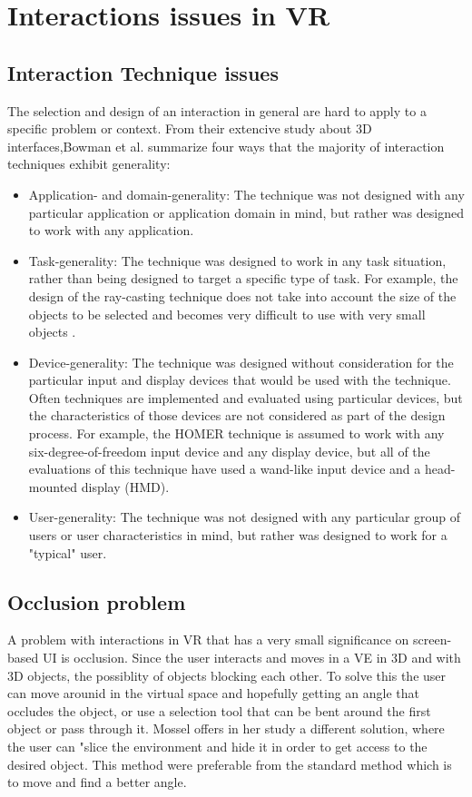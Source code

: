 \section{Interactions issues in VR}
\subsection{Interaction Technique issues}
The selection and design of an interaction in general are hard to apply to a specific problem or context. From their extencive study about 3D interfaces,Bowman et al. \cite{interactions:Bowman2006} summarize four ways that the majority of interaction techniques exhibit generality:
\begin{itemize}
  \item Application- and domain-generality: The technique was not designed with any particular application or application domain in mind, but rather was designed to work with any application.
  \item Task-generality: The technique was designed to work in any task situation, rather than being designed to target a specific type of task. For example, the design of the ray-casting technique does not take into account the size of the objects to be selected and becomes very difficult to use with very small objects \cite{interaction:Poupyrev1997}.
  \item Device-generality: The technique was designed without consideration for the particular input and display devices that would be used with the technique. Often techniques are implemented and evaluated using particular devices, but the characteristics of those devices are not considered as part of the design process. For example, the HOMER technique \cite{interactions:Bowman1997} is assumed to work with any six-degree-of-freedom input device and any display device, but all of the evaluations of this technique have used a wand-like input device and a head-mounted display (HMD).
  \item User-generality: The technique was not designed with any particular group of users or user characteristics in mind, but rather was designed to work for a "typical" user.
\end{itemize}

\subsection{Occlusion problem}
A problem with interactions in VR that has a very small significance on screen-based UI is occlusion. Since the user interacts and moves in a VE in 3D and with 3D objects, the possiblity of objects blocking each other. To solve this the user can move arounid in the virtual space and hopefully getting an angle that occludes the object, or use a selection tool that can be bent around the first object or pass through it. Mossel offers in her study a different solution, where the user can "slice the environment and hide it in order to get access to the desired object.\cite{interactions:Mossel2016}
This method were preferable from the standard method which is to move and find a better angle.
